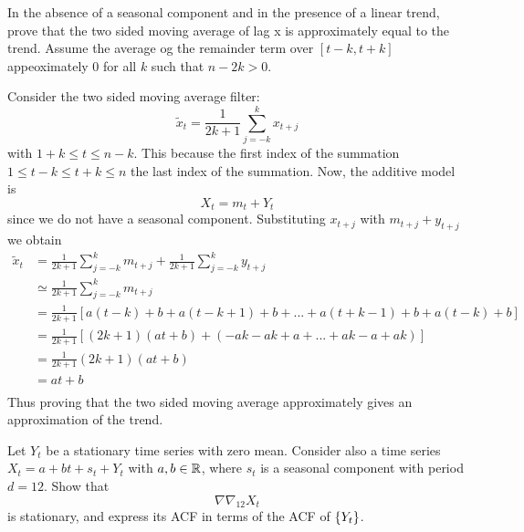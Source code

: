 \begin{example}
    In the absence of a seasonal component and in the presence of a linear trend, prove that the two sided moving average of lag x is approximately equal to the trend. Assume the average og the remainder term over $[t-k,t+k]$ appeoximately $0$ for all $k$ such that $n-2k>0$.

    Consider the two sided moving average filter:
    \[
        \tilde{x}_t=\frac{1}{2k+1}\sum_{j=-k}^kx_{t+j}  
    \]
    with $1+k\le t\le n-k$. This because the first index of the summation $1\le t-k \le t+k \le n$ the last index of the summation. Now, the additive model is
    \[
        X_t=m_t+Y_t  
    \]
    since we do not have a seasonal component. Substituting $x_{t+j}$ with $m_{t+j}+y_{t+j}$ we obtain
    \begin{equation}
        \begin{split}
            \tilde{x}_t&=\frac{1}{2k+1}\sum_{j=-k}^km_{t+j}+\frac{1}{2k+1}\sum_{j=-k}^ky_{t+j}\\
            &\simeq\frac{1}{2k+1}\sum_{j=-k}^km_{t+j}\\
            &=\frac{1}{2k+1}\left[a(t-k)+b+a(t-k+1)+b+...+a(t+k-1)+b+a(t-k)+b\right]\\
            &=\frac{1}{2k+1}\left[(2k+1)(at+b)+(-ak-ak+a+...+ak-a+ak)\right]\\
            &=\frac{1}{2k+1}(2k+1)(at+b)\\
            &=at+b\\
        \end{split}
    \end{equation}
    Thus proving that the two sided moving average approximately gives an approximation of the trend.
\end{example}

\begin{exercise}
    Let $Y_t$ be a stationary time series with zero mean. Consider also a time series $X_t=a+bt+s_t+Y_t$ with $a,b\in\mathbb{R}$, where $s_t$ is a seasonal component with period $d=12$. Show that 
    \[
        \nabla\nabla_{12}X_t  
    \]
    is stationary, and express its ACF in terms of the ACF of $\left\{Y_t\right\}$.
\end{exercise}